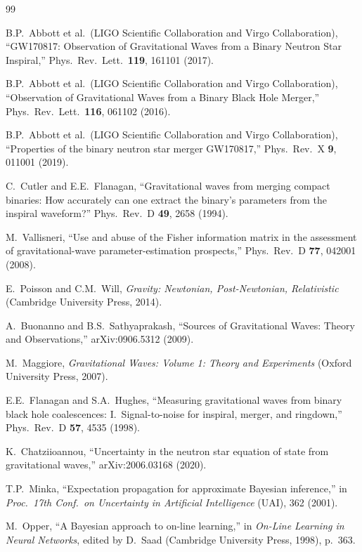 \documentclass[twocolumn,prd,showpacs,superscriptaddress]{revtex4-2}
\begin{document}
\begin{thebibliography}{99}

B.P.\ Abbott et al.\ (LIGO Scientific Collaboration and Virgo Collaboration),
``GW170817: Observation of Gravitational Waves from a Binary Neutron Star Inspiral,''
Phys.\ Rev.\ Lett.\ \textbf{119}, 161101 (2017).

B.P.\ Abbott et al.\ (LIGO Scientific Collaboration and Virgo Collaboration),
``Observation of Gravitational Waves from a Binary Black Hole Merger,''
Phys.\ Rev.\ Lett.\ \textbf{116}, 061102 (2016).

B.P.\ Abbott et al.\ (LIGO Scientific Collaboration and Virgo Collaboration),
``Properties of the binary neutron star merger GW170817,''
Phys.\ Rev.\ X \textbf{9}, 011001 (2019).

C.\ Cutler and E.E.\ Flanagan,
``Gravitational waves from merging compact binaries: How accurately can
one extract the binary's parameters from the inspiral waveform?''
Phys.\ Rev.\ D \textbf{49}, 2658 (1994).

M.\ Vallisneri,
``Use and abuse of the Fisher information matrix in the assessment of
gravitational-wave parameter-estimation prospects,''
Phys.\ Rev.\ D \textbf{77}, 042001 (2008).

E.\ Poisson and C.M.\ Will,
\emph{Gravity: Newtonian, Post-Newtonian, Relativistic}
(Cambridge University Press, 2014).

A.\ Buonanno and B.S.\ Sathyaprakash,
``Sources of Gravitational Waves: Theory and Observations,''
arXiv:0906.5312 (2009).

M.\ Maggiore,
\emph{Gravitational Waves: Volume 1: Theory and Experiments}
(Oxford University Press, 2007).

E.E.\ Flanagan and S.A.\ Hughes,
``Measuring gravitational waves from binary black hole coalescences:
I.\ Signal-to-noise for inspiral, merger, and ringdown,''
Phys.\ Rev.\ D \textbf{57}, 4535 (1998).

K.\ Chatziioannou,
``Uncertainty in the neutron star equation of state from gravitational
waves,''
arXiv:2006.03168 (2020).

T.P.\ Minka,
``Expectation propagation for approximate Bayesian inference,''
in \emph{Proc.\ 17th Conf.\ on Uncertainty in Artificial Intelligence}
(UAI), 362 (2001).

M.\ Opper,
``A Bayesian approach to on-line learning,''
in \emph{On-Line Learning in Neural Networks},
edited by D.\ Saad (Cambridge University Press, 1998), p.\ 363.

\end{thebibliography}
\end{document}
